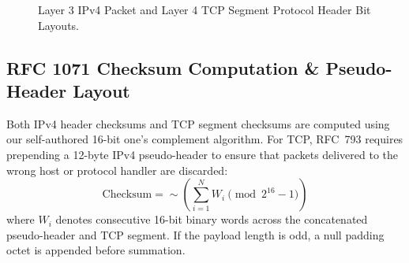 \begin{figure}[htbp]
\begin{minipage}[t]{0.49\textwidth}
\end{minipage}
\caption{Layer 3 IPv4 Packet and Layer 4 TCP Segment Protocol Header Bit Layouts.}
\label{fig:header_ipv4}
\label{fig:header_tcp}
\end{figure}

\subsection{RFC 1071 Checksum Computation \& Pseudo-Header Layout}
Both IPv4 header checksums and TCP segment checksums are computed using our self-authored 16-bit
one's complement algorithm. For TCP, RFC~793 requires prepending a 12-byte IPv4 pseudo-header
to ensure that packets delivered to the wrong host or protocol handler are discarded:
\begin{equation}
\text{Checksum} = \sim \left( \sum_{i=1}^{N} W_i \pmod{2^{16} - 1} \right)
\end{equation}
where $W_i$ denotes consecutive 16-bit binary words across the concatenated pseudo-header and TCP
segment. If the payload length is odd, a null padding octet is appended before summation.


